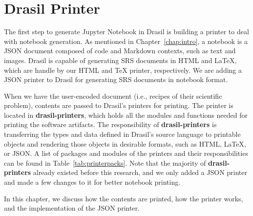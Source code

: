 \chapter{Drasil Printer} \label{chap:jsonprinter}
The first step to generate Jupyter Notebook in Drasil is building a printer to 
deal with notebook generation. As mentioned in Chapter~\ref{chap:intro}, a 
notebook is a JSON document composed of code and Markdown contexts, such as 
text and images. Drasil is capable of generating SRS documents in HTML and 
LaTeX, which are handle by our HTML and TeX printer, respectively. We are 
adding a JSON printer to Drasil for generating SRS documents in notebook format.

When we have the user-encoded document (i.e., recipes of their scientific 
problem), contents are passed to Drasil's printers for printing. 
The printer is located in \textbf{drasil-printers}, which holds all the 
modules and functions needed for printing the software artifacts. The 
responsibility of \textbf{drasil-printers} is transferring the types and data
defined in Drasil's source language to printable objects and rendering those 
objects in desirable formats, such as HTML, LaTeX, or JSON. A list of packages 
and modules of the printers and their responsibilities can be found in 
Table~\ref{tab:printerpacks}. Note that the majority of 
\textbf{drasil-printers} already existed before this research, and we only 
added a JSON printer and made a few changes to it for better notebook printing.

In this chapter, we discuss how the contents are printed, how the printer 
works, and the implementation of the JSON printer.

